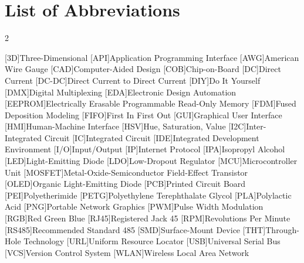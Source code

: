 {}

\section*{List of Abbreviations}
\begin{multicols}{2}
	\begin{acronym}[1234567890]\itemsep1pt
		[3D]{Three-Dimensional}
		[API]{Application Programming Interface}
		[AWG]{American Wire Gauge}
		[CAD]{Computer-Aided Design}
		[COB]{Chip-on-Board}
		[DC]{Direct Current}
		[DC-DC]{Direct Current to Direct Current}
		[DIY]{Do It Yourself}
		[DMX]{Digital Multiplexing}
		[EDA]{Electronic Design Automation}
		[EEPROM]{Electrically Erasable Programmable Read-Only Memory}
		[FDM]{Fused Deposition Modeling}
		{First In First Out}
		[GUI]{Graphical User Interface}
		[HMI]{Human-Machine Interface}
		[HSV]{Hue, Saturation, Value}
		[I2C]{Inter-Integrated Circuit}
		[IC]{Integrated Circuit}
		[IDE]{Integrated Development Environment}
		[I/O]{Input/Output}
		[IP]{Internet Protocol}
		[IPA]{Isopropyl Alcohol}
		[LED]{Light-Emitting Diode}
		[LDO]{Low-Dropout Regulator}
		[MCU]{Microcontroller Unit}
		[MOSFET]{Metal-Oxide-Semiconductor Field-Effect Transistor}
		{Organic Light-Emitting Diode}
		[PCB]{Printed Circuit Board}
		[PEI]{Polyetherimide}
		{Polyethylene Terephthalate Glycol}
		[PLA]{Polylactic Acid}
		[PNG]{Portable Network Graphics}
		[PWM]{Pulse Width Modulation}
		[RGB]{Red Green Blue}
		{Registered Jack 45}
		[RPM]{Revolutions Per Minute}
		[RS485]{Recommended Standard 485}
		[SMD]{Surface-Mount Device}
		[THT]{Through-Hole Technology}
		[URL]{Uniform Resource Locator}
		[USB]{Universal Serial Bus}
		[VCS]{Version Control System}
		{Wireless Local Area Network}
	\end{acronym}
\end{multicols}